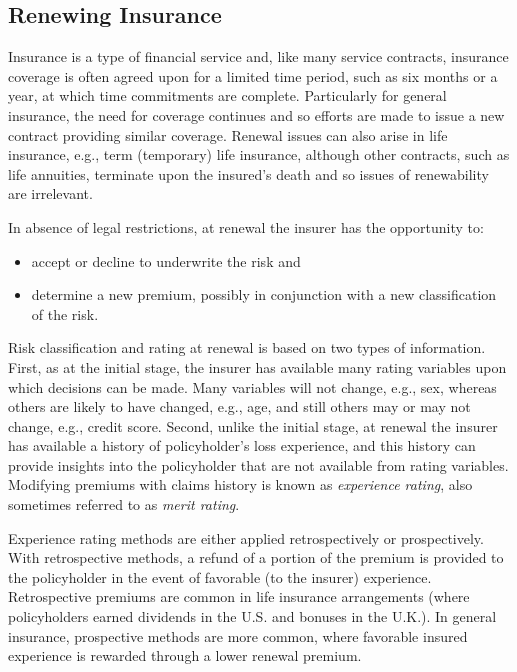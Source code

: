 \documentclass[]{book}
\theoremstyle{definition}
\theoremstyle{definition}
\theoremstyle{definition}
\theoremstyle{remark}
\begin{document}
\subsection{Renewing Insurance}\label{renewing-insurance}

Insurance is a type of financial service and, like many service
contracts, insurance coverage is often agreed upon for a limited time
period, such as six months or a year, at which time commitments are
complete. Particularly for general insurance, the need for coverage
continues and so efforts are made to issue a new contract providing
similar coverage. Renewal issues can also arise in life insurance, e.g.,
term (temporary) life insurance, although other contracts, such as life
annuities, terminate upon the insured's death and so issues of
renewability are irrelevant.

In absence of legal restrictions, at renewal the insurer has the
opportunity to:

\begin{itemize}
\item
  accept or decline to underwrite the risk and
\item
  determine a new premium, possibly in conjunction with a new
  classification of the risk.
\end{itemize}

Risk classification and rating at renewal is based on two types of
information. First, as at the initial stage, the insurer has available
many rating variables upon which decisions can be made. Many variables
will not change, e.g., sex, whereas others are likely to have changed,
e.g., age, and still others may or may not change, e.g., credit score.
Second, unlike the initial stage, at renewal the insurer has available a
history of policyholder's loss experience, and this history can provide
insights into the policyholder that are not available from rating
variables. Modifying premiums with claims history is known as
\emph{experience rating}, also sometimes referred to as \emph{merit
rating}.

Experience rating methods are either applied retrospectively or
prospectively. With retrospective methods, a refund of a portion of the
premium is provided to the policyholder in the event of favorable (to
the insurer) experience. Retrospective premiums are common in life
insurance arrangements (where policyholders earned dividends in the U.S.
and bonuses in the U.K.). In general insurance, prospective methods are
more common, where favorable insured experience is rewarded through a
lower renewal premium.
\end{document}
